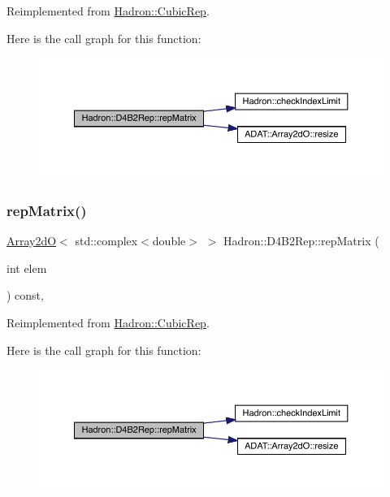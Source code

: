 Reimplemented from \mbox{\hyperlink{structHadron_1_1CubicRep_ac5d7e9e6f4ab1158b5fce3e4ad9e8005}{Hadron\+::\+Cubic\+Rep}}.

Here is the call graph for this function\+:
\nopagebreak
\begin{figure}[H]
\begin{center}
\leavevmode
\includegraphics[width=350pt]{d0/d07/structHadron_1_1D4B2Rep_a245244df26be686b405786bd1df4627e_cgraph}
\end{center}
\end{figure}
\mbox{\label{structHadron_1_1D4B2Rep_a245244df26be686b405786bd1df4627e}} 
\subsubsection{\texorpdfstring{repMatrix()}{repMatrix()}\hspace{0.1cm}{\footnotesize\ttfamily [3/3]}}
{\footnotesize\ttfamily \mbox{\hyperlink{classADAT_1_1Array2dO}{Array2dO}}$<$ std\+::complex$<$double$>$ $>$ Hadron\+::\+D4\+B2\+Rep\+::rep\+Matrix (\begin{DoxyParamCaption}\item[{int}]{elem }\end{DoxyParamCaption}) const\hspace{0.3cm}{\ttfamily [inline]}, {\ttfamily [virtual]}}



Reimplemented from \mbox{\hyperlink{structHadron_1_1CubicRep_ac5d7e9e6f4ab1158b5fce3e4ad9e8005}{Hadron\+::\+Cubic\+Rep}}.

Here is the call graph for this function\+:
\nopagebreak
\begin{figure}[H]
\begin{center}
\leavevmode
\includegraphics[width=350pt]{d0/d07/structHadron_1_1D4B2Rep_a245244df26be686b405786bd1df4627e_cgraph}
\end{center}
\end{figure}


